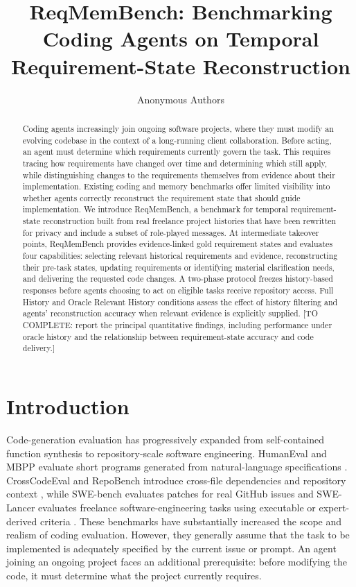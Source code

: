 \documentclass{article} %
\title{ReqMemBench: Benchmarking Coding Agents on Temporal Requirement-State Reconstruction }
\author{Anonymous Authors}
\begin{document}
\maketitle

\begin{abstract}
Coding agents increasingly join ongoing software projects, where they must modify an evolving codebase in the context of a long-running client collaboration. Before acting, an agent must determine which requirements currently govern the task. This requires tracing how requirements have changed over time and determining which still apply, while distinguishing changes to the requirements themselves from evidence about their implementation. Existing coding and memory benchmarks offer limited visibility into whether agents correctly reconstruct the requirement state that should guide implementation. We introduce ReqMemBench, a benchmark for temporal requirement-state reconstruction built from real freelance project histories that have been rewritten for privacy and include a subset of role-played messages. At intermediate takeover points, ReqMemBench provides evidence-linked gold requirement states and evaluates four capabilities: selecting relevant historical requirements and evidence, reconstructing their pre-task states, updating requirements or identifying material clarification needs, and delivering the requested code changes. A two-phase protocol freezes history-based responses before agents choosing to act on eligible tasks receive repository access. Full History and Oracle Relevant History conditions assess the effect of history filtering and agents’ reconstruction accuracy when relevant evidence is explicitly supplied. [TO COMPLETE: report the principal quantitative findings, including performance under oracle history and the relationship between requirement-state accuracy and code delivery.]
\end{abstract}

\section{Introduction}
\label{sec:introduction}
Code-generation evaluation has progressively expanded from self-contained function synthesis to repository-scale software engineering. HumanEval and MBPP evaluate short programs generated from natural-language specifications \citep{chen2021codex,austin2021mbpp}. CrossCodeEval and RepoBench introduce cross-file dependencies and repository context \citep{ding2023crosscodeeval,liu2024repobench}, while SWE-bench evaluates patches for real GitHub issues and SWE-Lancer evaluates freelance software-engineering tasks using executable or expert-derived criteria \citep{jimenez2024swebench,miserendino2025swelancer}. These benchmarks have substantially increased the scope and realism of coding evaluation. However, they generally assume that the task to be implemented is adequately specified by the current issue or prompt. An agent joining an ongoing project faces an additional prerequisite: before modifying the code, it must determine what the project currently requires.
\end{document}
